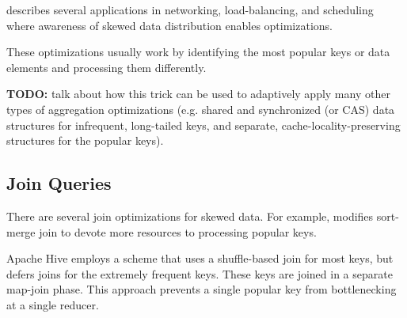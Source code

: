 \documentclass[12pt]{article}
\begin{document}
\cite{perf-eval-heavy-tail} describes several applications in networking,
load-balancing, and scheduling where awareness of skewed data distribution
enables optimizations.

These optimizations usually work by identifying the most popular keys or data
elements and processing them differently.

\textbf{TODO:} talk about how this trick can be used to adaptively apply many
other types of aggregation optimizations (e.g. shared and synchronized (or
CAS) data structures for infrequent, long-tailed keys, and separate,
cache-locality-preserving structures for the popular keys).



\subsection{Join Queries}

There are several join optimizations for skewed data.  For example,
\cite{smj-skew-optmization} modifies sort-merge join to devote more resources
to processing popular keys.

Apache Hive \cite{hive-join-strategies} employs a scheme that uses
a shuffle-based join for most keys, but defers joins for the extremely
frequent keys.  These keys are joined in a separate map-join phase.  This
approach prevents a single popular key from bottlenecking at a single reducer.


\end{document}
